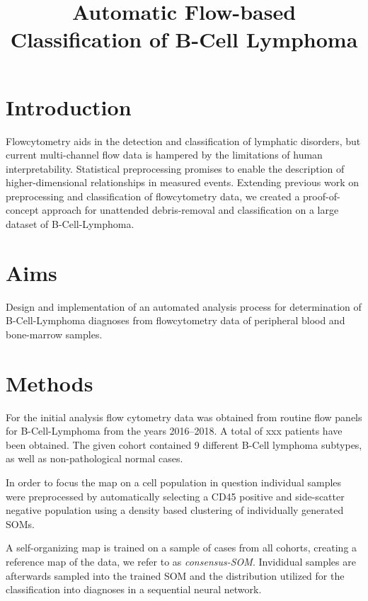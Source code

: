 \documentclass[11pt,a4paper]{article}
\begin{document}
\title{Automatic Flow-based Classification of B-Cell Lymphoma}


\section{Introduction}

Flowcytometry aids in the detection and classification of lymphatic disorders, but current multi-channel flow data is hampered by the limitations of human interpretability.
Statistical preprocessing promises to enable the description of higher-dimensional relationships in measured events.
Extending previous work on preprocessing and classification of flowcytometry data, we created a proof-of-concept approach for unattended debris-removal and classification on a large dataset of B-Cell-Lymphoma.

\section{Aims}

Design and implementation of an automated analysis process for determination of B-Cell-Lymphoma diagnoses from flowcytometry data of peripheral blood and bone-marrow samples.


\section{Methods}

For the initial analysis flow cytometry data was obtained from routine flow panels for B-Cell-Lymphoma from the years 2016--2018. A total of xxx patients have been obtained. The given cohort contained 9 different B-Cell lymphoma subtypes, as well as non-pathological normal cases.


In order to focus the map on a cell population in question individual samples were preprocessed by automatically selecting a CD45 positive and side-scatter negative population using a density based clustering of individually generated SOMs.

A self-organizing map is trained on a sample of cases from all cohorts, creating a reference map of the data, we refer to as \emph{consensus-SOM}.
Invididual samples are afterwards sampled into the trained SOM and the distribution utilized for the classification into diagnoses in a sequential neural network.

\end{document}
